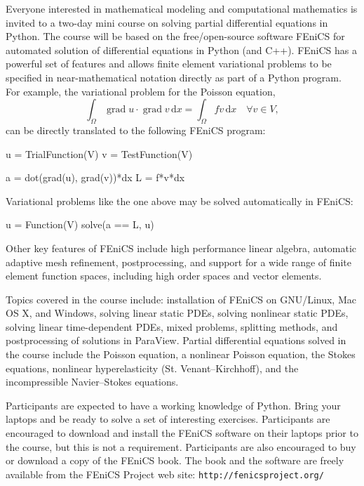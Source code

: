 \documentclass{article}
\newcommand{\dx}{\,\mathrm{d}x}
\DeclareMathOperator{\grad}{\mathrm{grad}}
\begin{document}
Everyone interested in mathematical modeling and computational
mathematics is invited to a two-day mini course on solving partial
differential equations in Python. The course will be based on the
free/open-source software FEniCS for automated solution of
differential equations in Python (and C++). FEniCS has a powerful set
of features and allows finite element variational problems to be
specified in near-mathematical notation directly as part of a Python
program. For example, the variational problem for the Poisson
equation,
\begin{equation}
  \int_{\Omega} \grad u \cdot \grad v \dx = \int_{\Omega} f v \dx
  \quad \forall v \in V,
\end{equation}
can be directly translated to the following FEniCS program:
\begin{python}
u = TrialFunction(V)
v = TestFunction(V)

a = dot(grad(u), grad(v))*dx
L = f*v*dx
\end{python}
Variational problems like the one above may be solved automatically in
FEniCS:
\begin{python}
u = Function(V)
solve(a == L, u)
\end{python}
Other key features of FEniCS include high performance linear algebra,
automatic adaptive mesh refinement, postprocessing, and support for a
wide range of finite element function spaces, including high order
spaces and vector elements.

Topics covered in the course include: installation of FEniCS on
GNU/Linux, Mac OS X, and Windows, solving linear static PDEs, solving
nonlinear static PDEs, solving linear time-dependent PDEs, mixed
problems, splitting methods, and postprocessing of solutions in
ParaView. Partial differential equations solved in the course include
the Poisson equation, a nonlinear Poisson equation, the Stokes
equations, nonlinear hyperelasticity (St. Venant--Kirchhoff), and the
incompressible Navier--Stokes equations.

Participants are expected to have a working knowledge of Python. Bring
your laptops and be ready to solve a set of interesting exercises.
Participants are encouraged to download and install the FEniCS
software on their laptops prior to the course, but this is not a
requirement. Participants are also encouraged to buy or download a
copy of the FEniCS book. The book and the software are freely
available from the FEniCS Project web site:
\texttt{http://fenicsproject.org/}
\end{document}
